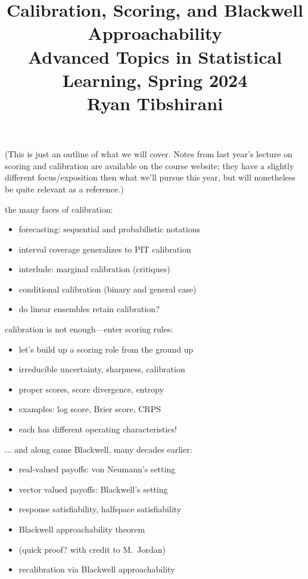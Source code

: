 \documentclass{article}
\title{Calibration, Scoring, and Blackwell Approachability \\ \smallskip
\large Advanced Topics in Statistical Learning, Spring 2024 \\ \smallskip
Ryan Tibshirani }
\date{}
\begin{document}
\maketitle
\RaggedRight
\vspace{-50pt}

(This is just an outline of what we will cover. Notes from last year's lecture
on scoring and calibration are available on the course website; they have a
slightly different focus/exposition then what we'll pursue this year, but will 
nonetheless be quite relevant as a reference.)  

\bigskip
the many faces of calibration: 

\begin{itemize}
\item forecasting: sequential and probabilistic notations
\item interval coverage generalizes to PIT calibration 
\item interlude: marginal calibration (critiques)
\item conditional calibration (binary and general case)
\item do linear ensembles retain calibration?
\end{itemize}

\bigskip
calibration is not enough---enter scoring rules:

\begin{itemize}
\item let's build up a scoring role from the ground up
\item irreducible uncertainty, sharpness, calibration 
\item proper scores, score divergence, entropy
\item examples: log score, Brier score, CRPS
\item each has different operating characteristics! 
\end{itemize}

\bigskip 
... and along came Blackwell, many decades earlier: 

\begin{itemize}
\item real-valued payoffs: von Neumann's setting
\item vector valued payoffs: Blackwell's setting
\item response satisfiability, halfspace satisfiability
\item Blackwell approachability theorem
\item (quick proof? with credit to M.\ Jordan)
\item recalibration via Blackwell approachability
\end{itemize}
\end{document}
